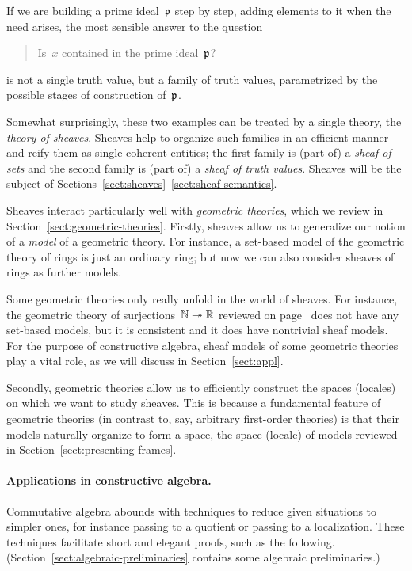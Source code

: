 \documentclass{ws-rv9x6}
\begin{document}
{If we are building a prime ideal~$\mathfrak{p}$ step by step, adding elements to it
when the need arises, the most sensible answer to the question
\begin{quote}
Is~$x$ contained in the prime ideal~$\mathfrak{p}$?
\end{quote}
is not a single truth value, but a family of truth values, parametrized by the
possible stages of construction of~$\mathfrak{p}$.

Somewhat surprisingly, these two examples can be treated by a single theory,
the \emph{theory of sheaves}. Sheaves help to organize such families in an
efficient manner and reify them as single coherent entities; the first family
is (part of) a \emph{sheaf of sets} and the second family is (part of) a
\emph{sheaf of truth values}. Sheaves will be the subject of
Sections~\ref{sect:sheaves}--\ref{sect:sheaf-semantics}.

Sheaves interact particularly well with \emph{geometric theories}, which we
review in Section~\ref{sect:geometric-theories}. Firstly, sheaves allow us to
generalize our notion of a \emph{model} of a geometric theory. For instance, a
set-based model of the geometric theory of rings is just an ordinary ring; but
now we can also consider sheaves of rings as further models.

Some geometric theories only really unfold in the world of sheaves. For
instance, the geometric theory of surjections~$\mathbb{N} \twoheadrightarrow \mathbb{R}$
reviewed on page~\pageref{item:theory-of-surjections} does not have any
set-based models, but it is consistent and it does have nontrivial sheaf
models. For the purpose of constructive algebra, sheaf models of some geometric
theories play a vital role, as we will discuss in Section~\ref{sect:appl}.

Secondly, geometric theories allow us to efficiently construct the spaces
(locales) on which we want to study sheaves. This is because a fundamental
feature of geometric theories (in contrast to, say, arbitrary first-order
theories) is that their models naturally organize to form a space, the
space (locale) of models reviewed in Section~\ref{sect:presenting-frames}.



\paragraph{Applications in constructive algebra.}
\label{par:appl-constr-alg}
Commutative algebra abounds with techniques to reduce given situations to
simpler ones, for instance passing to a quotient or passing to a
localization. These techniques facilitate short and elegant proofs, such as the
following. (Section~\ref{sect:algebraic-preliminaries} contains some algebraic
preliminaries.)

}
\end{document}
